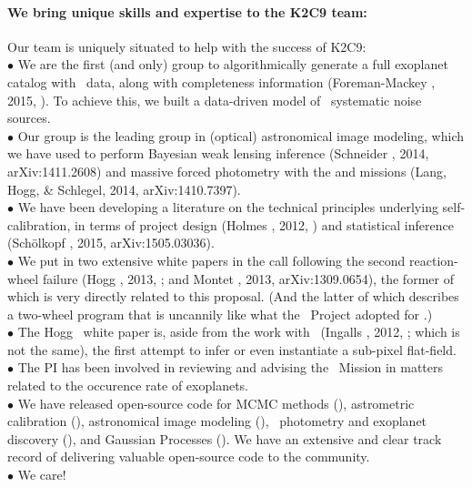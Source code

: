 \documentclass[12pt,preprint]{aastex}
\begin{document}
\paragraph{We bring unique skills and expertise to the K2C9 team:}

Our team is uniquely situated to help with the success of K2C9:\\
$\bullet$ We are the first (and only) group to algorithmically
generate a full exoplanet catalog with \ktwo\ data, along with
completeness information (Foreman-Mackey \etal, 2015, \opcit).
To achieve this, we built a data-driven model of \ktwo\ systematic
noise sources.\\
$\bullet$ Our group is the leading group in (optical) astronomical
image modeling, which we have used to perform Bayesian weak lensing
inference (Schneider \etal, 2014, arXiv:1411.2608) and
massive forced photometry with the  and 
missions (Lang, Hogg, \& Schlegel, 2014,
arXiv:1410.7397).\\
$\bullet$ We have been developing a literature on the technical
principles underlying self-calibration, in terms of project design
(Holmes \etal, 2012, \opcit) and statistical inference
(Sch\"olkopf \etal, 2015, arXiv:1505.03036).\\
$\bullet$ We put in two extensive white papers in the call following
the second reaction-wheel failure (Hogg \etal, 2013, \opcit; and
Montet \etal, 2013, arXiv:1309.0654), the former of which is very directly
related to this proposal.
(And the latter of which describes a two-wheel program that is uncannily
like what the \kepler\ Project adopted for \ktwo.)\\
$\bullet$ The Hogg \etal\ white paper is, aside from the work with
\spitzer\ (Ingalls \etal, 2012, \opcit; which is not the same), the first attempt
to infer or even instantiate a sub-pixel flat-field.\\
$\bullet$ The PI has
been involved in reviewing and advising the \kepler\ Mission
in matters related to the occurence rate of exoplanets.\\
$\bullet$ We have released open-source code for MCMC methods
(), astrometric calibration (),
astronomical image modeling (), \ktwo\ photometry
and exoplanet discovery (), and Gaussian Processes
().  We have an extensive and clear track record of
delivering valuable open-source code to the community.\\
$\bullet$ We care!
\end{document}
